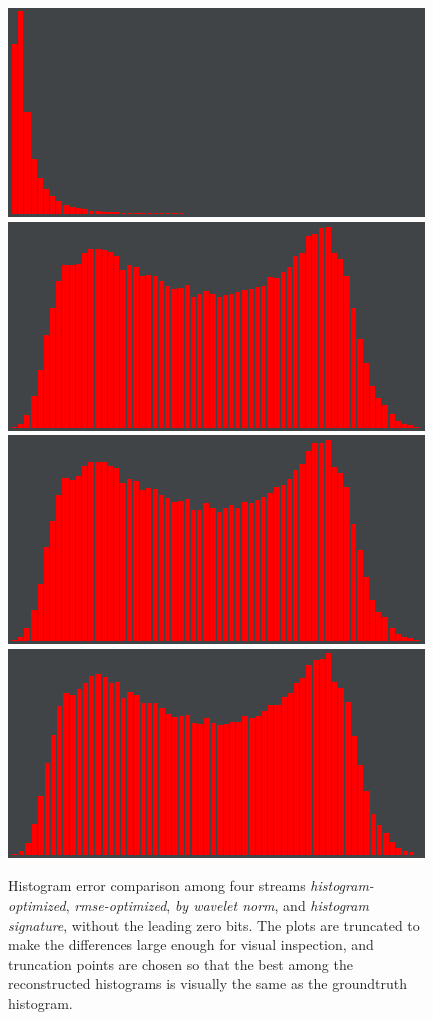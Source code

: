 \begin{figure}[h]
	{\includegraphics[width=0.32\linewidth]{img/histogram/histogram-renderings/histogram-turbulence-groundtruth.png}}
	{\includegraphics[width=0.32\linewidth]{img/histogram/histogram-renderings/histogram-velocityz-by-wavelet-norm.png}}
	{\includegraphics[width=0.32\linewidth]{img/histogram/histogram-renderings/histogram-velocityz-signature.png}}
	{\includegraphics[width=0.32\linewidth]{img/histogram/histogram-renderings/histogram-velocityz-groundtruth.png}}
	\caption{Histogram error comparison among four streams \emph{histogram-optimized},
	\emph{rmse-optimized}, \emph{by wavelet norm}, and \emph{histogram signature}, without the leading
	zero bits. The plots are truncated to make the differences large enough for visual inspection, and
	truncation points are chosen so that the best among the reconstructed histograms is visually the
	same as the groundtruth histogram. }
	\label{fig:histogram-stream-comparison}
\end{figure}


